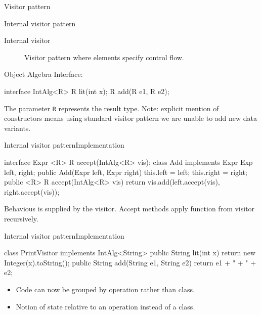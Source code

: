 \documentclass[10pt, compress]{beamer}
\newcommand{\inlinecode}[2]{\colorbox{backg}{\scriptsize{\texttt{#2}}}}
\newenvironment{slide}[1]{\begin{frame}[fragile,environment=slide]{#1}}{\end{frame}}
\newenvironment{slide}[2]{\begin{frame}[fragile,environment=slide]{#1}{#2}}{\end{frame}}
\begin{document}
\begin{slide}{Visitor pattern}
  \begin{figure}
    {
    
    \footnotesize
    
    }
  \end{figure}
\end{slide}


\begin{slide}{Internal visitor pattern}
  \begin{description}
    \item[Internal visitor] Visitor pattern where elements specify control flow.
  \end{description}
  Object Algebra Interface:
  \begin{java}
interface IntAlg<R> {
  R lit(int x);
  R add(R e1, R e2);
}
  \end{java}
The parameter \inlinecode{java}{R} represents the result type.
  Note: explicit mention of constructors means using standard visitor pattern we are unable to add new data variants.
\end{slide}


\begin{slide}{Internal visitor pattern}{Implementation}
  \begin{java}
interface Expr {
  <R> R accept(IntAlg<R> vis);
}
class Add implements Expr {
  Exp left, right;
  public Add(Expr left, Expr right) { 
    this.left = left; 
    this.right = right;
  }
  public <R> R accept(IntAlg<R> vis) {
    return vis.add(left.accept(vis), right.accept(vis));
  }
}
  \end{java}
  Behavious is supplied by the visitor.
  Accept methods apply function from visitor recursively.
\end{slide}


\begin{slide}{Internal visitor pattern}{Implementation}
\begin{java}
class PrintVisitor implements IntAlg<String> {
  public String lit(int x) {
    return new Integer(x).toString();
  }
  public String add(String e1, String e2) {
    return e1 + " + " + e2;
  }
}
\end{java}
\begin{itemize}
\item Code can now be grouped by operation rather than class.
\item Notion of state relative to an operation instead of a class.
\end{itemize}
\end{slide}
\end{document}
